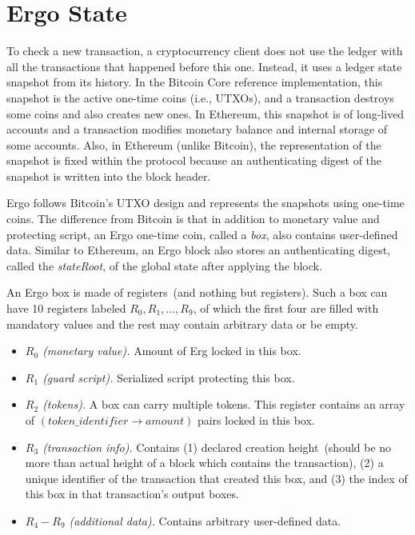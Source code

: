 \section{Ergo State}
\label{sec:utxo}

To check a new transaction, a cryptocurrency client does not use the ledger with all the transactions that happened before this
one. Instead, it uses a ledger state snapshot from its history. In the Bitcoin Core reference implementation, this snapshot is the active one-time coins (i.e., UTXOs), and a transaction destroys some coins and also creates new ones.
In Ethereum, this snapshot is of long-lived accounts and a transaction modifies monetary balance and internal storage of some accounts.  
Also, in Ethereum (unlike Bitcoin), the representation of the snapshot is fixed within the protocol because an authenticating digest of the snapshot is written into the block header. 

Ergo follows Bitcoin's UTXO design and represents the snapshots using one-time coins. The difference from Bitcoin is that in addition to monetary value and protecting script, an Ergo one-time coin, called a {\em box}, also contains user-defined data.
Similar to Ethereum, an Ergo block also stores an authenticating digest, called the {\em stateRoot}, of the global state after applying the block. 

An Ergo box is made of registers~(and nothing but registers). Such a box can have 10 registers labeled $R_0,R_1,\ldots,R_9$, of which the first four are filled with mandatory values and the rest may contain arbitrary data or be empty.


\begin{itemize}
    \item{\em $R_0$ (monetary value). } Amount of Erg locked in this box.
    \item{\em $R_1$ (guard script). } Serialized script protecting this box.
    \item{\em $R_2$ (tokens). } A box can carry multiple tokens. This register contains an array of
    $(token\_identifier \rightarrow amount)$ pairs locked in this box.
    \item{\em $R_3$ (transaction info). } Contains (1) declared creation height~(should be no more than actual height of a block which contains the transaction),
    (2) a unique identifier of the transaction that created this box, and (3) the index of this box in that transaction's output boxes. 
    \item{\em $R_4-R_9$ (additional data). } Contains arbitrary user-defined data.
\end{itemize}


